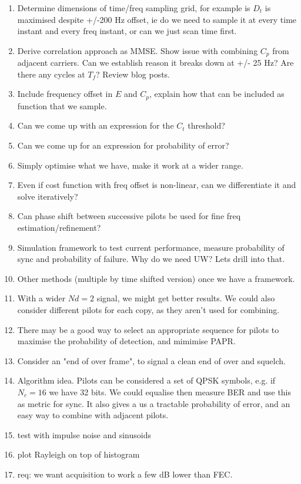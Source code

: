 \documentclass{article}
\begin{document}
{\begin{enumerate}
\item Determine dimensions of time/freq sampling grid, for example is $D_t$ is maximised despite +/-200 Hz offset, ie do we need to sample it at every time instant and every freq instant, or can we just scan time first.
\item Derive correlation approach as MMSE.  Show issue with combining $C_p$ from adjacent carriers. Can we establish reason it breaks down at +/- 25 Hz?  Are there any cycles at $T_f$?  Review blog posts.
\item Include frequency offset in $E$ and $C_p$, explain how that can be included as function that we sample.
\item Can we come up with an expression for the $C_t$ threshold?
\item Can we come up for an expression for probability of error?
\item Simply optimise what we have, make it work at a wider range.
\item Even if cost function with freq offset is non-linear, can we differentiate it and solve iteratively?
\item Can phase shift between successive pilots be used for fine freq estimation/refinement?
\item Simulation framework to test current performance, measure probability of sync and probability of failure.  Why do we need UW?  Lets drill into that.
\item Other methods (multiple by time shifted version) once we have a framework.
\item With a wider $Nd=2$ signal, we might get better results.  We could also consider different pilots for each copy, as they aren't used for combining.
\item There may be a good way to select an appropriate sequence for pilots to maximise the probability of detection, and mimimise PAPR.
\item Consider an "end of over frame", to signal a clean end of over and squelch.
\item Algorithm idea. Pilots can be considered a set of QPSK symbols, e.g. if $N_c=16$ we have 32 bits. We could equalise then measure BER and use this as metric for sync.  It also gives a us a tractable probability of error, and an easy way to combine with adjacent pilots.
\item test with impulse noise and sinusoids
\item plot Rayleigh on top of histogram
\item req: we want acquisition to work a few dB lower than FEC.
\end{enumerate}

}
\end{document}
